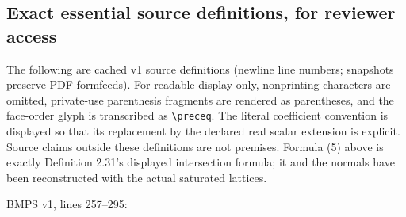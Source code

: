 \documentclass[
  11pt,
]{article}
\begin{document}
\subsection{Exact essential source definitions, for reviewer
access}\label{exact-essential-source-definitions-for-reviewer-access}

The following are cached v1 source definitions (newline line numbers;
snapshots preserve PDF formfeeds). For readable display only,
nonprinting characters are omitted, private-use parenthesis fragments
are rendered as parentheses, and the face-order glyph is transcribed as
\texttt{\textbackslash{}preceq}. The literal coefficient convention is
displayed so that its replacement by the declared real scalar extension
is explicit. Source claims outside these definitions are not premises.
Formula (5) above is exactly Definition 2.31's displayed intersection
formula; it and the normals have been reconstructed with the actual
saturated lattices.

BMPS v1, lines 257--295:
\end{document}
